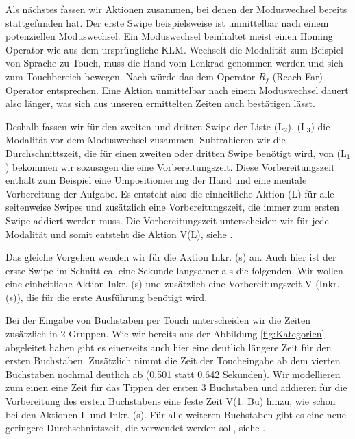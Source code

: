 Als nächstes fassen wir Aktionen zusammen, bei denen der Moduswechsel bereits stattgefunden hat. 
Der erste Swipe beispielsweise ist unmittelbar nach einem potenziellen Moduswechsel. 
Ein Moduswechsel beinhaltet meist einen Homing Operator wie aus dem ursprüngliche KLM. 
Wechselt die Modalität zum Beispiel von Sprache zu Touch, muss die Hand vom Lenkrad genommen werden und sich zum Touchbereich bewegen. 
Nach \citet{Green_2002} würde das dem Operator $R_f$ (Reach Far) Operator entsprechen. 
Eine Aktion unmittelbar nach einem Moduswechsel dauert also länger, was sich aus unseren ermittelten Zeiten auch bestätigen lässt. 

Deshalb fassen wir für den zweiten und dritten Swipe der Liste (L$_2$), (L$_3$) die Modalität vor dem Moduswechsel zusammen. Subtrahieren wir die Durchschnittszeit, die für einen zweiten oder dritten Swipe benötigt wird, von (L$_1$) bekommen wir sozusagen die eine Vorbereitungszeit. Diese Vorbereitungszeit enthält zum Beispiel eine Umpositionierung der Hand und eine mentale Vorbereitung der Aufgabe. Es entsteht also die einheitliche Aktion (L) für alle seitenweise Swipes und zusätzlich eine Vorbereitungszeit, die immer zum ersten Swipe addiert werden muss. Die Vorbereitungszeit unterscheiden wir für jede Modalität und somit entsteht die Aktion V(L), siehe .
 
Das gleiche Vorgehen wenden wir für die Aktion Inkr. (s) an. Auch hier ist der erste Swipe im Schnitt ca. eine Sekunde langsamer als die folgenden. Wir wollen eine einheitliche Aktion Inkr. (s) und zusätzlich eine Vorbereitungszeit V (Inkr. (s)), die für die erste Ausführung benötigt wird. 
 
Bei der Eingabe von Buchstaben per Touch unterscheiden wir die Zeiten zusätzlich in 2 Gruppen. 
Wie wir bereits aus der Abbildung \ref{fig:Kategorien} abgeleitet haben gibt es einerseits auch hier eine deutlich längere Zeit für den ersten Buchstaben. 
Zusätzlich nimmt die Zeit der Toucheingabe ab dem vierten Buchstaben nochmal deutlich ab (0,501 statt 0,642 Sekunden). 
Wir modellieren zum einen eine Zeit für das Tippen der ersten 3 Buchstaben und addieren für die Vorbereitung des ersten Buchstabens eine feste Zeit V(1. Bu) hinzu, wie schon bei den Aktionen L und Inkr. (s). 
Für alle weiteren Buchstaben gibt es eine neue geringere Durchschnittszeit, die verwendet werden soll, siehe .  

